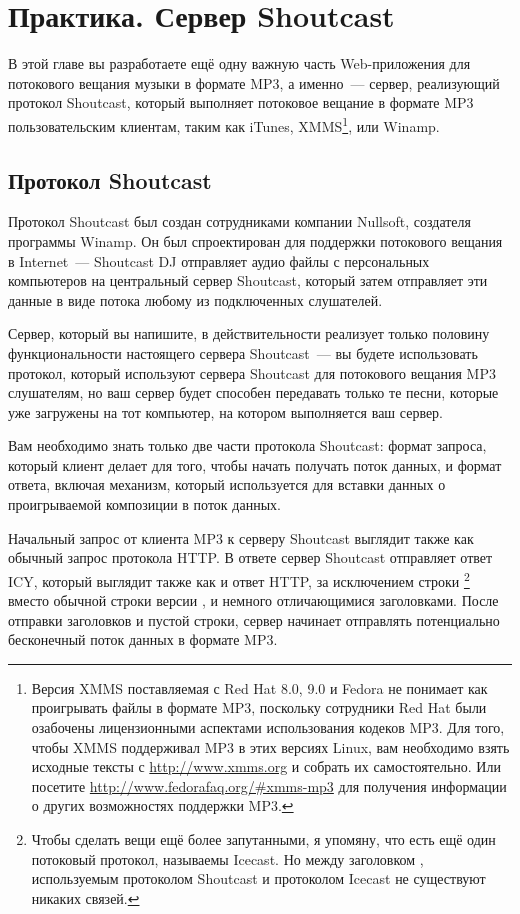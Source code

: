 \chapter{Практика. Сервер Shoutcast}
\label{ch:28}

В этой главе вы разработаете ещё одну важную часть Web-приложения для потокового вещания
музыки в формате MP3, а именно~--- сервер, реализующий протокол Shoutcast, который
выполняет потоковое вещание в формате MP3 пользовательским клиентам, таким как iTunes,
XMMS\footnote{Версия XMMS поставляемая с Red Hat 8.0, 9.0 и Fedora не понимает как
  проигрывать файлы в формате MP3, поскольку сотрудники Red Hat были озабочены
  лицензионными аспектами использования кодеков MP3.  Для того, чтобы XMMS поддерживал MP3
  в этих версиях Linux, вам необходимо взять исходные тексты с \url{http://www.xmms.org} и
  собрать их самостоятельно.  Или посетите \url{http://www.fedorafaq.org/#xmms-mp3} для
  получения информации о других возможностях поддержки MP3.}, или Winamp.

\section{Протокол Shoutcast}

Протокол Shoutcast был создан сотрудниками компании Nullsoft, создателя программы
Winamp. Он был спроектирован для поддержки потокового вещания в Internet~--- Shoutcast DJ
отправляет аудио файлы с персональных компьютеров на центральный сервер Shoutcast, который
затем отправляет эти данные в виде потока любому из подключенных слушателей.

Сервер, который вы напишите, в действительности реализует только половину функциональности
настоящего сервера Shoutcast~--- вы будете использовать протокол, который используют
сервера Shoutcast для потокового вещания MP3 слушателям, но ваш сервер будет способен
передавать только те песни, которые уже загружены на тот компьютер, на котором выполняется
ваш сервер.

Вам необходимо знать только две части протокола Shoutcast: формат запроса, который клиент
делает для того, чтобы начать получать поток данных, и формат ответа, включая механизм,
который используется для вставки данных о проигрываемой композиции в поток данных.

Начальный запрос от клиента MP3 к серверу Shoutcast выглядит также как обычный запрос
протокола HTTP.  В ответе сервер Shoutcast отправляет ответ ICY, который выглядит также
как и ответ HTTP, за исключением строки \footnote{Чтобы сделать вещи ещё более
  запутанными, я упомяну, что есть ещё один потоковый протокол, называемы Icecast. Но
  между заголовком , используемым протоколом Shoutcast и протоколом Icecast не
  существуют никаких связей.} вместо обычной строки версии , и немного
отличающимися заголовками. После отправки заголовков и пустой строки, сервер начинает
отправлять потенциально бесконечный поток данных в формате MP3.

